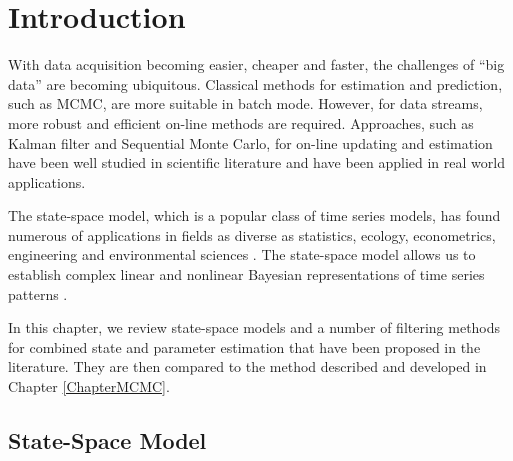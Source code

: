
\section{Introduction}

With data acquisition becoming easier, cheaper and faster, the challenges of ``big data'' are becoming ubiquitous. Classical methods for estimation and prediction, such as MCMC, are more suitable in batch mode. However, for data streams, more robust and efficient on-line methods are required. Approaches, such as Kalman filter and Sequential Monte Carlo, for on-line updating and estimation have been well studied in scientific literature and have been applied in real world applications.

The state-space model, which is a popular class of time series models, has found numerous of applications in fields as diverse as statistics, ecology, econometrics, engineering and environmental sciences \citep{cappe2009inference, smcmip2011, elliott1995estimation, cargnoni1997bayesian}. The state-space model allows us to establish complex linear and nonlinear Bayesian representations of time series patterns \citep{vieira2016online}. 


In this chapter, we review state-space models and a number of filtering methods for combined state and parameter estimation that have been proposed in the literature. They are then compared to the method described and developed in Chapter \ref{ChapterMCMC}. 


\subsection*{State-Space Model}


